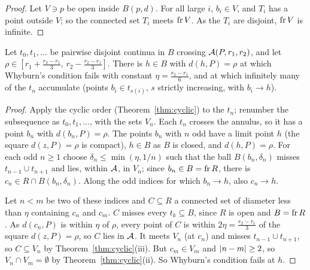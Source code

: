 \begin{proof}
Let $V\ni p$ be open inside $B(p,d)$. For all large $i$, $b_i\in V$, and $T_i$ has a point outside $V$; so the connected set $T_i$ meets $\operatorname{fr} V$. As the $T_i$ are disjoint, $\operatorname{fr} V$ is infinite.
\end{proof}


\begin{lemma}\label{lem:bad-point}
Let $t_0,t_1,\dots$ be pairwise disjoint continua in $B$ crossing $\mathcal{A}(P,r_1,r_2)$, and let $\rho\in[r_1+\frac{r_2-r_1}3,\,r_2-\frac{r_2-r_1}3]$. There is $h\in B$ with $d(h,P)=\rho$ at which Whyburn's
condition fails with constant $\eta=\frac{r_2-r_1}6$, and at which infinitely many of the $t_n$ accumulate (points $b_i\in t_{s(i)}$, $s$ strictly increasing, with $b_i\to h$).
\end{lemma}

\begin{proof}
Apply the cyclic order (Theorem~\ref{thm:cyclic}) to the $t_n$; renumber the subsequence as $t_0,t_1,\dots$, with the sets $V_n$. Each $t_n$ crosses the annulus, so it has a point $b_n$ with
$d(b_n,P)=\rho$. The points $b_n$ with $n$ odd have a limit point $h$ (the square $d(z,P)=\rho$ is compact), $h\in B$ as $B$ is closed, and $d(h,P)=\rho$. For each odd $n\ge1$ choose $\delta_n\le\min(\eta,1/n)$
such that the ball $B(b_n,\delta_n)$ misses $t_{n-1}\cup t_{n+1}$ and lies, within $\mathcal{A}$, in $V_n$; since $b_n\in B=\operatorname{fr} R$, there is $c_n\in R\cap B(b_n,\delta_n)$. Along the odd indices for which
$b_n\to h$, also $c_n\to h$.

Let $n<m$ be two of these indices and $C\subseteq R$ a connected set of diameter less than $\eta$ containing $c_n$ and $c_m$. $C$ misses every $t_k\subseteq B$, since $R$ is open and $B=\operatorname{fr} R$. As $d(c_n,P)$ is
within $\eta$ of $\rho$, every point of $C$ is within $2\eta=\frac{r_2-r_1}3$ of the square $d(z,P)=\rho$, so $C$ lies in $\mathcal{A}$. It meets $V_n$ (at $c_n$) and misses $t_{n-1}\cup t_{n+1}$, so $C\subseteq V_n$ by Theorem~\ref{thm:cyclic}(iii). But $c_m\in V_m$ and $\left\lvert n-m\right\rvert\ge2$, so $V_n\cap V_m=\emptyset$
by Theorem~\ref{thm:cyclic}(ii). So Whyburn's condition fails at $h$.
\end{proof}


